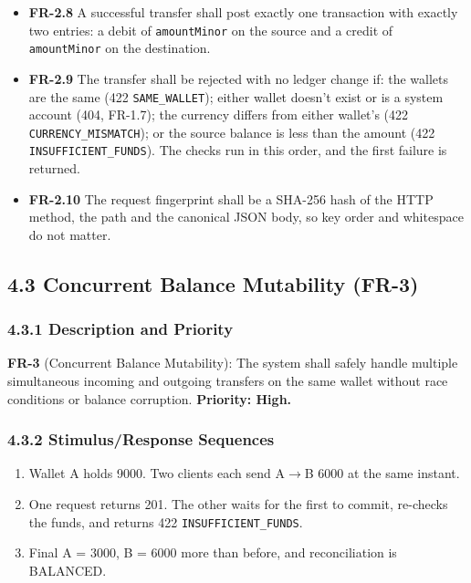 \documentclass[11pt,a4paper]{article}
\providecommand{\tightlist}{\setlength{\itemsep}{2pt}\setlength{\parskip}{0pt}}
\begin{document}
\begin{itemize}
  than 24 hours after first sending it (A-4).
\item
  \textbf{FR-2.8} A successful transfer shall post exactly one transaction with exactly two entries: a
  debit of \texttt{amountMinor} on the source and a credit of \texttt{amountMinor} on the destination.
\item
  \textbf{FR-2.9} The transfer shall be rejected with no ledger change if: the wallets are the same (422
  \texttt{SAME\_\allowbreak{}WALLET}); either wallet doesn't exist or is a system account (404, FR-1.7); the currency
  differs from either wallet's (422 \texttt{CURRENCY\_\allowbreak{}MISMATCH}); or the source balance is less than the
  amount (422 \texttt{INSUFFICIENT\_\allowbreak{}FUNDS}). The checks run in this order, and the first failure is
  returned.
\item
  \textbf{FR-2.10} The request fingerprint shall be a SHA-256 hash of the HTTP method, the path and the
  canonical JSON body, so key order and whitespace do not matter.
\end{itemize}

\subsection{4.3 Concurrent Balance Mutability (FR-3)}\label{concurrent-balance-mutability-fr-3}

\subsubsection{4.3.1 Description and Priority}\label{description-and-priority-2}

\textbf{FR-3} (Concurrent Balance Mutability): The system shall safely handle multiple simultaneous
incoming and outgoing transfers on the same wallet without race conditions or balance corruption.
\textbf{Priority: High.}

\subsubsection{4.3.2 Stimulus/Response Sequences}\label{stimulusresponse-sequences-2}

\begin{enumerate}
\def\labelenumi{\arabic{enumi}.}
\tightlist
\item
  Wallet A holds 9000. Two clients each send A\ensuremath{\rightarrow}B 6000 at the same instant.
\item
  One request returns 201. The other waits for the first to commit, re-checks the funds, and
  returns 422 \texttt{INSUFFICIENT\_\allowbreak{}FUNDS}.
\item
  Final A = 3000, B = 6000 more than before, and reconciliation is BALANCED.
\end{enumerate}
\end{document}

